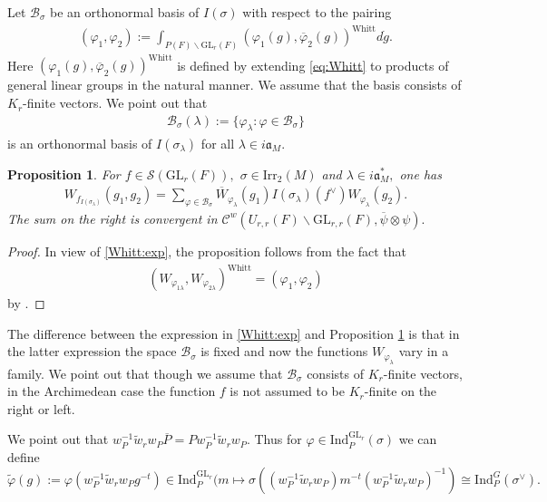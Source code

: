 \documentclass[12pt]{amsart}
\newtheorem{prop}[thm]{Proposition}
\theoremstyle{remark}
\numberwithin{equation}{section}
\newcommand{\GL}{\mathrm{GL}}
\theoremstyle{definition}
\numberwithin{equation}{subsection}
\begin{document}
Let $
    \mathcal{B}_{\sigma}$
be an orthonormal basis of $I(\sigma)$ with respect to the pairing
\begin{align} \label{Bsiginnerpro}
    \left(\varphi_1,\varphi_2 \right):= \int_{P(F) \backslash \GL_r(F)} (\varphi_1(g),\overline{\varphi}_2(g))^{\mathrm{Whitt}} d\dot{g}.
\end{align}
Here $(\varphi_1(g),\overline{\varphi}_2(g))^{\mathrm{Whitt}}$ is defined by extending \eqref{eq:Whitt} to products of general linear groups in the natural manner.
We assume that the basis consists of $K_r$-finite vectors.  
We point out that 
\begin{align} \label{base:twist}
    \mathcal{B}_{\sigma}(\lambda):=\{\varphi_\lambda:\varphi \in \mathcal{B}_{\sigma}\}
\end{align}
is an orthonormal basis of $I(\sigma_\lambda)$ for all $\lambda \in i \mathfrak{a}_M.$






\begin{prop} \label{prop:Whitt:exp}
For $f \in \mathcal{S}(\GL_r(F)),$  $\sigma \in \mathrm{Irr}_2(M)$ and $\lambda \in i\mathfrak{a}_M^*,$ one has
\begin{align*} 
    W_{f_{I(\sigma_\lambda)}}(g_1,g_2)=\sum_{\varphi \in \mathcal{B}_{\sigma}}\overline{W}_{\varphi_{\lambda}}(g_1)I(\sigma_\lambda)(f^\vee)W_{\varphi_{\lambda}}(g_2).
\end{align*}
The sum on the right is convergent in $\mathcal{C}^w(U_{r,r}(F) \backslash \GL_{r,r}(F),\overline{\psi} \otimes \psi).$
\end{prop}
\begin{proof}  In view of \eqref{Whitt:exp},
the proposition follows from the fact that 
\begin{align*} 
(W_{\varphi_{1\lambda}},W_{\varphi_{2\lambda}})^{\mathrm{Whitt}}=(\varphi_1,\varphi_2)
\end{align*}
by \cite[Proposition A.2]{FLO}. 
\end{proof}
The difference between the expression in  \eqref{Whitt:exp} and Proposition \ref{prop:Whitt:exp} is that in the latter expression the space $\mathcal{B}_{\sigma}$ is fixed and now the functions $W_{\varphi_{\lambda}}$ vary in a family.  We point out that though we assume that $\mathcal{B}_{\sigma}$  consists of $K_r$-finite vectors, in the Archimedean case the function $f$ is not assumed to be $K_r$-finite on the right or left.


We point out that $w_P^{-1}\widetilde{w}_rw_P\overline{P}=Pw_P^{-1}\widetilde{w}_rw_P.$  Thus for $\varphi \in \mathrm{Ind}_{P}^{\GL_r}(\sigma)$ we can define
$$
\widetilde{\varphi}(g):=\varphi(w_P^{-1} \widetilde{w}_rw_Pg^{-t}) \in \mathrm{Ind}_P^{\GL_r}(m \mapsto \sigma((w_P^{-1} \widetilde{w}_rw_P)m^{-t}(w_P^{-1} \widetilde{w}_rw_P)^{-1}) \cong \mathrm{Ind}_P^G(\sigma^\vee).
$$
\end{document}
